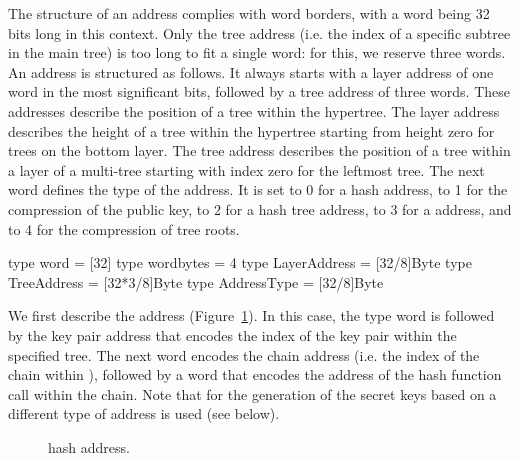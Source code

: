    The structure of an address complies with word borders, with a word
   being 32 bits long in this context.  Only the tree address
   (i.e. the index of a specific subtree in the main tree) is too
   long to fit a single word: for this, we reserve three words. An address is
   structured as follows.  It always starts with a layer address of one
   word in the most significant bits, followed by a tree address of three
   words.  These addresses describe the position of a tree within the hypertree.
   The layer address describes the height of a tree within the
   hypertree starting from height zero for trees on the bottom layer.
   The tree address describes the position
   of a tree within a layer of a multi-tree starting with index zero for
   the leftmost tree.  The next word defines the type of the address.
   It is set to 0 for a \wotsp hash address, to 1 for the compression of the \wotsp public key,
   to 2 for a hash tree address, to 3 for a \fors address, and to 4 for the compression
   of \fors tree roots.

\begin{code}
  type word = [32]
  type wordbytes = 4
  type LayerAddress = [32/8]Byte
  type TreeAddress = [32*3/8]Byte
  type AddressType = [32/8]Byte
\end{code}

   We first describe the \wotsp address (Figure~\ref{fig:adrs:wots}).
   In this case, the type word
   is followed by the key pair address that encodes the index of the \wotsp
   key pair within the specified tree.  The next word encodes the chain address
   (i.e. the index of the chain within \wotsp),
   followed by a word that encodes the address of the hash function call
   within the chain. Note that for the generation of the secret keys based on \sseed a different type of address is used (see below).

\begin{figure}[h]
  \centering
  \caption{\wotsp hash address.}
  \label{fig:adrs:wots}
\end{figure}



